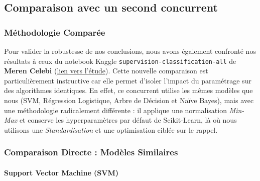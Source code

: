\documentclass[11pt]{article}
\begin{document}
\subsection{Comparaison avec un second
  concurrent}\label{comparaison-avec-un-second-concurrent}

\subsubsection{Méthodologie Comparée}\label{muxe9thodologie-comparuxe9e}

Pour valider la robustesse de nos conclusions, nous avons également
confronté nos résultats à ceux du notebook Kaggle
\texttt{supervision-classification-all} de \textbf{Meren Celebi}
(\href{https://www.kaggle.com/code/merencelebi/supervision-classification-all}{lien
  vers l'étude}). Cette nouvelle comparaison est particulièrement
instructive car elle permet d'isoler l'impact du paramétrage sur des
algorithmes identiques. En effet, ce concurrent utilise les mêmes
modèles que nous (SVM, Régression Logistique, Arbre de Décision et Naïve
Bayes), mais avec une méthodologie radicalement différente : il applique
une normalisation \emph{Min-Max} et conserve les hyperparamètres par
défaut de Scikit-Learn, là où nous utilisons une \emph{Standardisation}
et une optimisation ciblée sur le rappel.

\subsubsection{Comparaison Directe : Modèles
  Similaires}\label{comparaison-directe-moduxe8les-similaires}

\paragraph{Support Vector Machine
  (SVM)}\label{support-vector-machine-svm}
\end{document}
